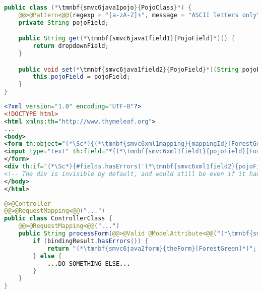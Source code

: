 \enlargethispage{10mm}
\thispagestyle{empty}
\begin{lstlisting}[language=Java, title={POJO class with restricted String field}]
public class (*\tmnbf{smvc6java1pojo}{PojoClass}*) {
    @@>@Pattern<@@(regexp = "[a-zA-Z]+", message = "ASCII letters only")
    private String pojoField;

    public String get(*\tmnbf{smvc6java1field1}{PojoField}*)() {
        return dropdownField;
    }

    public void set(*\tmnbf{smvc6java1field2}{PojoField}*)(String pojoField) {
        this.pojoField = pojoField;
    }
}
\end{lstlisting}
\begin{lstlisting}[language=XML, title={HTML form \tmnbf{smvc6xml1form}{\textit{theForm}}\textit{.html} setting the field}]
<?xml version="1.0" encoding="UTF-8"?>
<!DOCTYPE html>
<html xmlns:th="http://www.thymeleaf.org">
...
<body>
<form th:object="(*\Sc*){(*\tmnbf{smvc6xml1mapping}{mappingId}[ForestGreen]*)}" ...>
<input type="text" th:field="*{(*\tmnbf{smvc6xml1field1}{pojoField}[ForestGreen]*)}">
</form>
<div th:if="(*\Sc*){#fields.hasErrors('(*\tmnbf{smvc6xml1field2}{pojoField}[ForestGreen]*)')}" th:errors="*{(*\tmnbf{smvc6xml1field3}{pojoField}[ForestGreen]*)}"/>
<!-- The div is invisible by default, and would still be even if it had some content -->
</body>
</html>
\end{lstlisting}
\begin{lstlisting}[language=Java, title={Controller processing the form}]
@>@Controller
@@>@RequestMapping<@@("...")
public class ControllerClass {
    @@>@RequestMapping<@@("...")
    public String processForm(@@>@Valid @ModelAttribute<@@("(*\tmnbf{smvc6java2mapping}{mappingId}[ForestGreen]*)") (*\tmnbf{smvc6java2pojo}{PojoClass}*) pojo, BindingResult bindingResult) {
        if (bindingResult.hasErrors()) {
            return "(*\tmnbf{smvc6java2form}{theForm}[ForestGreen]*)";
        } else {
            ...DO SOMETHING ELSE...
        }
    }
}
\end{lstlisting}
\newpage

